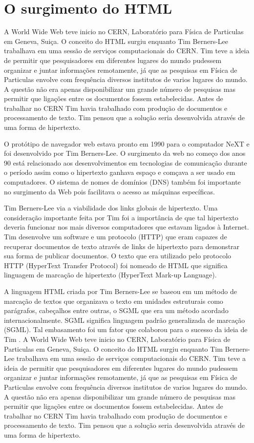 \section{O surgimento do HTML}
A World Wide Web teve inicio no CERN, Laboratório para Física de Particulas em Geneva, Suiça. O conceito do HTML surgiu enquanto Tim Berners-Lee trabalhava em uma sessão de serviços computacionais do CERN. Tim teve a ideia de permitir que pesquisadores em diferentes lugares do mundo pudessem organizar e juntar informações remotamente, já que as pesquisas em Física de Particulas envolve com frequência diversos institutos de varios lugares do mundo. A questão não era apenas disponibilizar um grande número de pesquisas mas permitir que ligações entre os documentos fossem estabelecidas. Antes de trabalhar no CERN Tim havia trabalhado com produção de documentos e processamento de texto. Tim pensou que a solução seria desenvolvida através de uma forma de hipertexto.

O protótipo de navegador web estava pronto em 1990 para o computador NeXT e foi desenvolvido por Tim Berners-Lee. O surgimento da web no começo dos anos 90 está relacionado aos desenvolvimentos em tecnologias de comunicação durante o período assim como o hipertexto ganhava espaço e comçava a ser usado em computadores. O sistema de nomes de domínios (DNS) também foi importante no surgimento da Web pois facilitava o acesso as máquinas específicas.

Tim Berners-Lee via a viabilidade dos links globais de hipertexto. Uma consideração importante feita por Tim foi a importância de que tal hipertexto deveria funcionar nos mais diversos computadores que estavam ligados à Internet. Tim desenvolve um software e um protocolo (HTTP) que eram capazes de recuperar documentos de texto através de links de hipertexto para demonstrar sua forma de publicar documentos. O texto que era utilizado pelo protocolo HTTP (HyperText Transfer Protocol) foi nomeado de HTML que significa linguagem de marcação de hipertexto (HyperText Mark-up Language).

A linguagem HTML criada por Tim Berners-Lee se baseou em um método de marcação de textos que organizava o texto em unidades estruturais como parágrafos, cabeçalhos entre outras, o SGML que era um método acordado internacionalmente. SGML significa linguagem padrão generalizada de marcação (SGML). Tal embasamento foi um fator que colaborou para o sucesso da ideia de Tim \cite{htmlHist}. A World Wide Web teve inicio no CERN, Laboratório para Física de Particulas em Geneva, Suiça. O conceito do HTML surgiu enquanto Tim Berners-Lee trabalhava em uma sessão de serviços computacionais do CERN. Tim teve a ideia de permitir que pesquisadores em diferentes lugares do mundo pudessem organizar e juntar informações remotamente, já que as pesquisas em Física de Particulas envolve com frequência diversos institutos de varios lugares do mundo. A questão não era apenas disponibilizar um grande número de pesquisas mas permitir que ligações entre os documentos fossem estabelecidas. Antes de trabalhar no CERN Tim havia trabalhado com produção de documentos e processamento de texto. Tim pensou que a solução seria desenvolvida através de uma forma de hipertexto.

